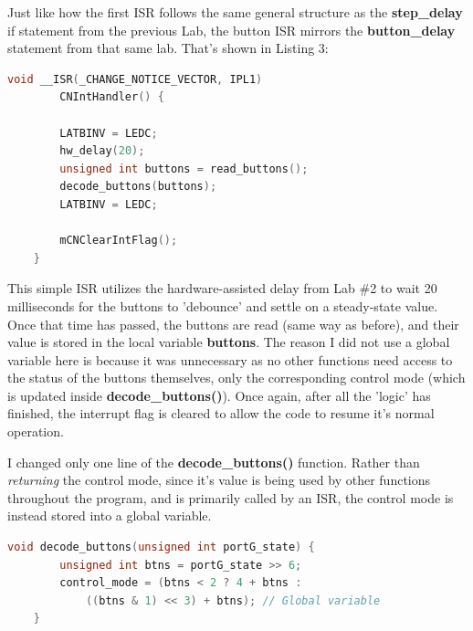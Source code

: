 \documentclass[a4paper, 12pt]{article}
\begin{document}
Just like how the first ISR follows the same general structure as the \textbf{step\_delay} if statement from the previous Lab, the button ISR mirrors the \textbf{button\_delay} statement from that same lab. That's shown in Listing 3:
\newpage
	\begin{mdframed}[backgroundcolor=code-gray, roundcorner=10pt,
								innerleftmargin=5, innertopmargin=5, innerbottommargin=5]	
	\begin{lstlisting}[language=C, caption=Button Interrupt Service Routine, tabsize=2]
	void __ISR(_CHANGE_NOTICE_VECTOR, IPL1)
		CNIntHandler() {
		
		LATBINV = LEDC;
		hw_delay(20);
		unsigned int buttons = read_buttons();
		decode_buttons(buttons);
		LATBINV = LEDC;

		mCNClearIntFlag();
	}
	\end{lstlisting}
	\end{mdframed}
	
This simple ISR utilizes the hardware-assisted delay from Lab \#2 to wait 20 milliseconds for the buttons to 'debounce' and settle on a steady-state value. Once that time has passed, the buttons are read (same way as before), and their value is stored in the local variable \textbf{buttons}. The reason I did not use a global variable here is because it was unnecessary as no other functions need access to the status of the buttons themselves, only the corresponding control mode (which is updated inside \textbf{decode\_buttons()}). Once again, after all the 'logic' has finished, the interrupt flag is cleared to allow the code to resume it's normal operation.

I changed only one line of the \textbf{decode\_buttons()} function. Rather than \textit{returning} the control mode, since it's value is being used by other functions throughout the program, and is primarily called by an ISR, the control mode is instead stored into a global variable.

	\begin{mdframed}[backgroundcolor=code-gray, roundcorner=10pt,
								innerleftmargin=5, innertopmargin=5, innerbottommargin=5]	
	\begin{lstlisting}[language=C, caption=Button Decoding, tabsize=2]
	void decode_buttons(unsigned int portG_state) {
		unsigned int btns = portG_state >> 6;
		control_mode = (btns < 2 ? 4 + btns :
			((btns & 1) << 3) + btns); // Global variable
	}
	\end{lstlisting}
	\end{mdframed}
	
\end{document}
